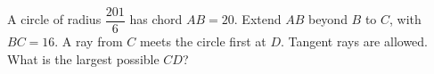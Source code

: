 A circle of radius $\dfrac{201}{6}$ has chord $AB=20$. Extend $AB$ beyond $B$ to $C$, with $BC=16$. A ray from $C$ meets the circle first at $D$. Tangent rays are allowed. What is the largest possible $CD$?

